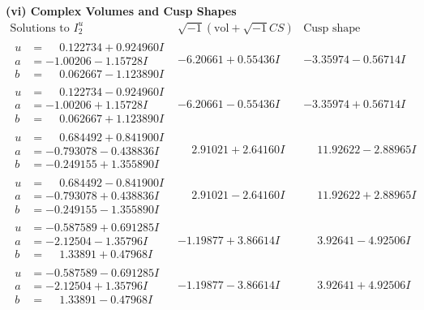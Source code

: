 \documentclass[1p]{elsarticle_modified}
\theoremstyle{definition}
\newcommand{\I}{\sqrt{-1}}
\begin{document}
\newpage\flushleft \textbf{(vi) Complex Volumes and Cusp Shapes}
$$\begin{array}{c|c|c}  
\text{Solutions to }I^u_{2}& \I (\text{vol} + \sqrt{-1}CS) & \text{Cusp shape}\\
 \hline 
\begin{aligned}
u &= \phantom{-}0.122734 + 0.924960 I \\
a &= -1.00206 - 1.15728 I \\
b &= \phantom{-}0.062667 - 1.123890 I\end{aligned}
 & -6.20661 + 0.55436 I & -3.35974 - 0.56714 I \\ \hline\begin{aligned}
u &= \phantom{-}0.122734 - 0.924960 I \\
a &= -1.00206 + 1.15728 I \\
b &= \phantom{-}0.062667 + 1.123890 I\end{aligned}
 & -6.20661 - 0.55436 I & -3.35974 + 0.56714 I \\ \hline\begin{aligned}
u &= \phantom{-}0.684492 + 0.841900 I \\
a &= -0.793078 - 0.438836 I \\
b &= -0.249155 + 1.355890 I\end{aligned}
 & \phantom{-}2.91021 + 2.64160 I & \phantom{-}11.92622 - 2.88965 I \\ \hline\begin{aligned}
u &= \phantom{-}0.684492 - 0.841900 I \\
a &= -0.793078 + 0.438836 I \\
b &= -0.249155 - 1.355890 I\end{aligned}
 & \phantom{-}2.91021 - 2.64160 I & \phantom{-}11.92622 + 2.88965 I \\ \hline\begin{aligned}
u &= -0.587589 + 0.691285 I \\
a &= -2.12504 - 1.35796 I \\
b &= \phantom{-}1.33891 + 0.47968 I\end{aligned}
 & -1.19877 + 3.86614 I & \phantom{-}3.92641 - 4.92506 I \\ \hline\begin{aligned}
u &= -0.587589 - 0.691285 I \\
a &= -2.12504 + 1.35796 I \\
b &= \phantom{-}1.33891 - 0.47968 I\end{aligned}
 & -1.19877 - 3.86614 I & \phantom{-}3.92641 + 4.92506 I \\ \hline\begin{aligned}

\end{aligned}
\end{array}$$
\end{document}
